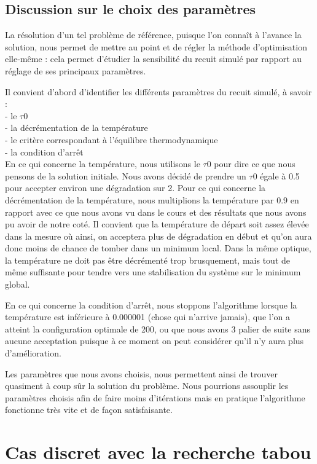 \documentclass{report}
\begin{document}
\section{Discussion sur le choix des paramètres}
La résolution d'un tel problème de référence, puisque l'on connaît à l'avance la solution, nous permet de mettre au point et de régler la méthode d'optimisation elle-même : cela permet d'étudier la sensibilité du recuit simulé par rapport au réglage de ses principaux paramètres.

Il convient d'abord d'identifier les différents paramètres du recuit simulé, à savoir :\\
- le $\tau 0$\\
- la décrémentation de la température\\
- le critère correspondant à l'équilibre thermodynamique\\
- la condition d'arrêt\\

En ce qui concerne la température, nous utilisons le $\tau 0$ pour dire ce que nous pensons de la solution initiale. Nous avons décidé de prendre un $\tau 0$ égale à 0.5 pour accepter environ une dégradation sur 2. Pour ce qui concerne la décrémentation de la température, nous multiplions la température par 0.9 en rapport avec ce que nous avons vu dans le cours et des résultats que nous avons pu avoir de notre coté. Il convient que la température de départ soit assez élevée dans la mesure où ainsi, on acceptera plus de dégradation en début et qu'on aura donc moins de chance de tomber dans un minimum local. Dans la même optique, la température ne doit pas être décrémenté trop brusquement, mais tout de même suffisante pour tendre vers une stabilisation du système sur le minimum global.

En ce qui concerne la condition d'arrêt, nous stoppons l'algorithme lorsque la température est inférieure à 0.000001 (chose qui n'arrive jamais), que l'on a atteint la configuration optimale de 200, ou que nous avons 3 palier de suite sans aucune acceptation puisque à ce moment on peut considérer qu'il n'y aura plus d'amélioration.

Les paramètres que nous avons choisis, nous permettent ainsi de trouver quasiment à coup sûr la solution du problème. Nous pourrions assouplir les paramètres choisis afin de faire moins d'itérations mais en pratique l'algorithme fonctionne très vite et de façon satisfaisante.

\newpage

\chapter{Cas discret avec la recherche tabou}
\minitoc
\end{document}
